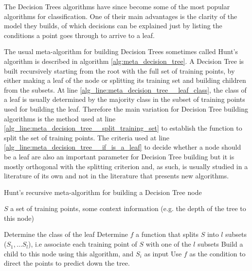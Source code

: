 The Decision Trees algorithms have since become some of the most popular algorithms for classification. One of their main advantages is the clarity of the model they builds, of which decisions can be explained just by listing the conditions a point goes through to arrive to a leaf.

The usual meta-algorithm for building Decision Trees sometimes called Hunt's algorithm \cite{Priyanka2020_decision_trees_survey} is described in algorithm \ref{alg:meta_decision_tree}. A Decision Tree is built recursively starting from the root with the full set of training points, by either making a leaf of the node or splitting its training set and building children from the subsets.
At line \ref{alg_line:meta_decision_tree__leaf_class}, the class of a leaf is usually determined by the majority class in the subset of training points used for building the leaf. Therefore the main variation for Decision Tree building algorithms is the method used at line \ref{alg_line:meta_decision_tree__split_training_set} to establish the function to split the set of training points. The criteria used at line \ref{alg_line:meta_decision_tree__if_is_a_leaf} to decide whether a node should be a leaf are also an important parameter for Decision Tree building but it is mostly orthogonal with the splitting criterion and, as such, is usually studied in a literature of its own and not in the literature that presents new algorithms.

\begin{algorithm}
\caption{Hunt's recursive meta-algorithm for building a Decision Tree node}
\label{alg:meta_decision_tree}
\begin{algorithmic}[1]
    \Require $S$ a set of training points, some context information (e.g. the depth of the tree to this node)
    
        \State Determine the class of the leaf \label{alg_line:meta_decision_tree__leaf_class}
    \Else
        \State Determine $f$ a function that splits $S$ into $l$ subsets ($S_1, \dots S_l$), i.e associate each training point of $S$ with one of the $l$ subsets\label{alg_line:meta_decision_tree__split_training_set}
            \State Build a child to this node using this algorithm, and $S_i$ as input\label{alg_line:meta_decision_tree__build_children}
        \EndFor
        \State Use $f$ as the condition to direct the points to predict down the tree.
    \EndIf
\end{algorithmic}
\end{algorithm}

